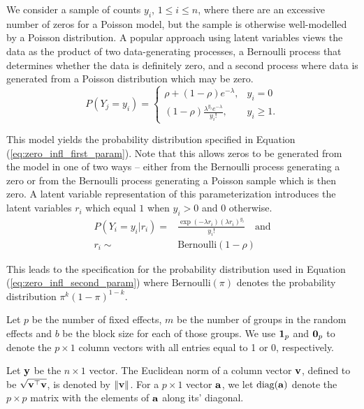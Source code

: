 We consider a sample of counts $y_i$, $1 \le i\le n$, where there are an
excessive number of zeros for a Poisson model, but the sample is otherwise
well-modelled by a Poisson distribution. A popular approach using latent
variables views the data as the product of two data-generating processes, a
Bernoulli process that determines whether the data is definitely zero, and a
second process where data is generated from a Poisson distribution which may be
zero.
\begin{equation}
\label{eq:zero_infl_first_param}
	P(Y_j = y_i) = \left\{ \begin{array}{ll}
        \rho + (1 - \rho) e^{-\lambda},  & y_i = 0 \\
	    (1 - \rho) \frac{\lambda^{y_i} e^{-\lambda}} {y_i!},  &y_i \ge 1.
	\end{array} \right.
\end{equation}

This model yields the probability distribution specified in Equation
(\ref{eq:zero_infl_first_param}).  Note that this allows zeros to be generated
from the model in one of two ways -- either from the Bernoulli process
generating a zero or from the Bernoulli process generating a Poisson sample
which is then zero. A latent variable representation of this parameterization
introduces the latent variables $r_i$ which equal $1$ when $y_i>0$ and $0$
otherwise. 
\begin{equation}
\label{eq:zero_infl_second_param}
\begin{array}{rl}
	P(Y_i=y_i|r_i) = & \frac{\exp(-\lambda r_i)(\lambda r_i)^{y_i}}{y_i!} \quad \mbox{and} \\
	r_i \sim & \mbox{Bernoulli}(1-\rho)
\end{array}
\end{equation}

\noindent This leads to the specification for the probability distribution used
in Equation (\ref{eq:zero_infl_second_param}) where $\text{Bernoulli}(\pi)$
denotes the probability distribution $\pi^k (1 - \pi)^{1-k}$.

Let $p$ be the number of fixed effects, $m$ be the number of groups in the
random effects and $b$ be the block size for each of those groups. We use
${\bf 1}_p$ and ${\bf 0}_p$ to denote the $p \times 1$ column vectors with all
entries equal to 1 or 0, respectively.

Let ${\bf y}$ be the $n \times 1$ vector. The Euclidean norm of a column vector
${\bf v}$, defined to be $\sqrt{{\bf v}^\top {\bf v}}$, is  denoted by $\|{\bf v}\|$. For a $p
\times 1$ vector ${\bf a}$, we let $\text{diag}{({\bf a})}$ denote the $p \times p$ matrix
with the elements of ${\bf a}$ along its' diagonal.

